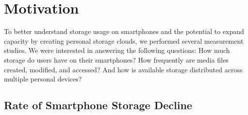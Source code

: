 
\section{Motivation}
\label{sec-motivation}

To better understand storage usage on smartphones and the potential to expand
capacity by creating personal storage clouds, we performed several
measurement studies. We were interested in answering the following questions:
How much storage do users have on their smartphones? How frequently
are media files created, modified, and accessed? And how is available storage
distributed across multiple personal devices?

\subsection{Rate of Smartphone Storage Decline}

